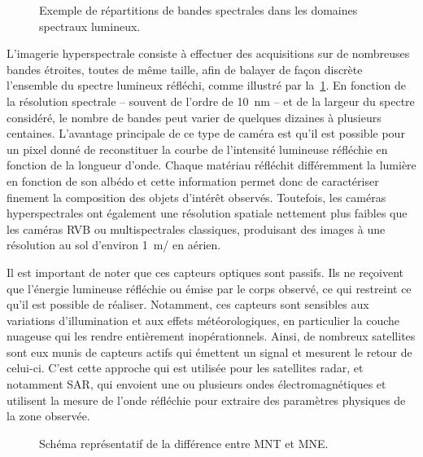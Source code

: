 \begin{figure}
  \resizebox{\textwidth}{!}{
  
  }
  \caption{Exemple de répartitions de bandes spectrales dans les domaines spectraux lumineux.}
  \label{fig:hyperspectral}
\end{figure}

L'imagerie hyperspectrale consiste à effectuer des acquisitions sur de nombreuses bandes étroites, toutes de même taille, afin de balayer de façon discrète l'ensemble du spectre lumineux réfléchi, comme illustré par la~\cref{fig:hyperspectral}. En fonction de la résolution spectrale -- souvent de l'ordre de \SI{10}{\nano\meter} -- et de la largeur du spectre considéré, le nombre de bandes peut varier de quelques dizaines à plusieurs centaines. L'avantage principale de ce type de caméra est qu'il est possible pour un pixel donné de reconstituer la courbe de l'intensité lumineuse réfléchie en fonction de la longueur d'onde. Chaque matériau réfléchit différemment la lumière en fonction de son albédo et cette information permet donc de caractériser finement la composition des objets d'intérêt observés. Toutefois, les caméras hyperspectrales ont également une résolution spatiale nettement plus faibles que les caméras \gls{RVB} ou multispectrales classiques, produisant des images à une résolution au sol d'environ \SI{1}{\meter/\px} en aérien.

Il est important de noter que ces capteurs optiques sont passifs. Ils ne reçoivent que l'énergie lumineuse réfléchie ou émise par le corps observé, ce qui restreint ce qu'il est possible de réaliser. Notamment, ces capteurs sont sensibles aux variations d'illumination et aux effets météorologiques, en particulier la couche nuageuse qui les rendre entièrement inopérationnels. Ainsi, de nombreux satellites sont eux munis de capteurs actifs qui émettent un signal et mesurent le retour de celui-ci. C'est cette approche qui est utilisée pour les satellites radar, et notamment \gls{SAR}, qui envoient une ou plusieurs ondes électromagnétiques et utilisent la mesure de l'onde réfléchie pour extraire des paramètres physiques de la zone observée.

\begin{figure}
  \resizebox{\textwidth}{!}{
  
  }
  \caption{Schéma représentatif de la différence entre \gls{MNT} et \gls{MNE}.}
  \label{fig:mnt}
\end{figure}

